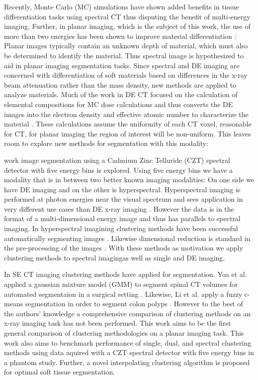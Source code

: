 \documentclass[a4paper,11pt]{article}
\begin{document}
Recently, Monte Carlo (MC) simulations have shown added benefits in tissue differentiation tasks using spectral CT \cite{Lalonde2016ACT} thus disputing the benefit of multi-energy imaging. Further, in planar imaging, which is the subject of this work, the use of more than two energies has been shown to improve material differentiation \cite{OConnell2019OptimalDetector}: Planar images typically contain an unknown depth of material, which must also be determined to identify the material. Thus spectral image is hypothesized to aid in planar imaging segmentation tasks. Since spectral and DE imaging are concerned with differentiation of soft materials based on differences in the x-ray beam attenuation rather than the mass density, new methods are applied to analyze materials. Much of the work in DE CT focused on the calculation of elemental compositions for MC dose calculations and thus converts the DE images into the electron density and effective atomic number to characterize the material \cite{Bazalova2008Dual-energyCalculations,Landry2013DerivingCoefficients,Saito2017ABody}. These calculations assume the uniformity of each CT voxel, reasonable for CT, for planar imaging the region of interest will be non-uniform. This leaves room to explore new methods for segmentation with this modality:

work image segmentation using a Cadmium Zinc Telluride (CZT) spectral detector with five energy bins is explored. Using five energy bins we have a modality that is in between two better known imaging modalities: On one side we have DE imaging and on the other is hyperspectral. Hyperspectral imaging is performed at photon energies near the visual spectrum and sees application in very different use cases than DE x-ray imaging \cite{Lu2014MedicalReview.,Khan2018ModernReview}. However the data is in the format of a multi-dimensional energy image and thus has parallels to spectral imaging. In hyperspectral imagining clustering methods have been successful automatically segmenting images \cite{Murphy2018UnsupervisedDiffusion,Gillis2012HyperspectralGraphs,Noe2001PartialClustering}. Likewise dimensional reduction is standard in the pre-processing of the images \cite{Mahesh2015HyperspectralMaterials}. With these methods as motivation we apply clustering methods to spectral imagingas well as single and DE imaging.

In SE CT imaging clustering methods have applied for segmentation. Yoa et al. applied a gaussian mixture model (GMM) to segment spinal CT volumes for automated segmentaion in a surgical setting \cite{Yao2004ColonicModels}. Likewise, Li et al. apply a fuzzy c-means segmentation in order to segment colon polyps \cite{Li2008ImprovedRadiography}. However to the best of the authors' knowledge a comprehensive comparison of clustering methods on an x-ray imaging task has not been performed. This work aims to be the first general comparison of clustering methodologies on a planar imaging task. This work also aims to benchmark performance of single, dual, and spectral clustering methods using data aquired with a CZT spectral detector with five energy bins in a phantom study. Further, a novel interpolating clustering algorithm is proposed for optimal soft tissue segmentation.
\end{document}

